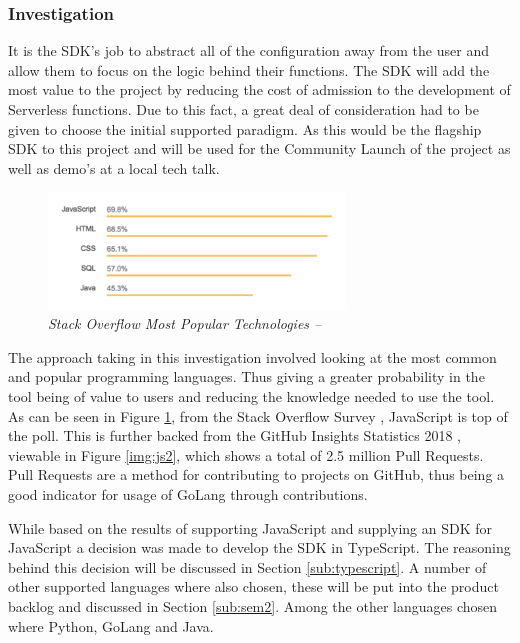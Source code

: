 \subsubsection{Investigation}
\label{sub:sdk_invest}
 It is the \gls{SDK}'s job to abstract all of the configuration away from the user and allow them to focus on the logic behind their functions. The \gls{SDK} will add the most value to the project by reducing the cost of admission to the development of \gls{Serverless} functions. Due to this fact, a great deal of consideration had to be given to choose the initial supported paradigm. As this would be the flagship \gls{SDK} to this project and will be used for the Community Launch of the project as well as demo's at a local tech talk. 
\begin{figure}[!ht]
\centering
\includegraphics*[width=0.7\textwidth]{images/a3.png}
\caption{\em Stack Overflow Most Popular Technologies --  \cite{overflow_2018}}
\label{img:js1}
\end{figure}

The approach taking in this investigation involved looking at the most common and popular programming languages. Thus giving a greater probability in the tool being of value to users and reducing the knowledge needed to use the tool. As can be seen in Figure \ref{img:js1}, from the Stack Overflow Survey \citep{overflow_2018}, JavaScript is top of the poll. This is further backed from the \gls{GitHub} Insights Statistics 2018 \cite{octoverse_2017_2018}, viewable in Figure \ref{img:js2}, which shows a total of 2.5 million Pull Requests. Pull Requests are a method for contributing to projects on \gls{GitHub}, thus being a good indicator for usage of \gls{GoLang} through contributions.

While based on the results of supporting JavaScript and supplying an SDK for JavaScript a decision was made to develop the SDK in TypeScript. The reasoning behind this decision will be discussed in Section \ref{sub:typescript}. A number of other supported languages where also chosen, these will be put into the product backlog and discussed in Section \ref{sub:sem2}. Among the other languages chosen where Python, \gls{GoLang} and Java.

